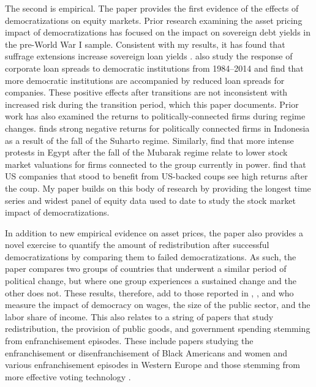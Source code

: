 \documentclass[12pt]{article}
\numberwithin{equation}{section}
\begin{document}
The second is empirical. The paper provides the first evidence of the effects of democratizations on equity markets. Prior research examining the asset pricing impact of democratizations has focused on the impact on sovereign debt yields in the pre-World War I sample. Consistent with my results, it has found that suffrage extensions increase sovereign loan yields \citep{Dasgupta2021,Tuncer2022}. \cite*{Delis2019} also study the response of corporate loan spreads to democratic institutions from 1984--2014 and find that more democratic institutions are accompanied by reduced loan spreads for companies. These positive effects after transitions are not inconsistent with increased risk during the transition period, which this paper documents. Prior work has also examined the returns to politically-connected firms during regime changes. \cite{Fisman2001} finds strong negative returns for politically connected firms in Indonesia as a result of the fall of the Suharto regime. Similarly, \cite*{Acemoglu2018} find that more intense protests in Egypt after the fall of the Mubarak regime relate to lower stock market valuations for firms connected to the group currently in power. \cite*{Dube2011} find that US companies that stood to benefit from US-backed coups see high returns after the coup. My paper builds on this body of research by providing the longest time series and widest panel of equity data used to date to study the stock market impact of democratizations.

In addition to new empirical evidence on asset prices, the paper also provides a novel exercise to quantify the amount of redistribution after successful democratizations by comparing them to failed democratizations. As such, the paper compares two groups of countries that underwent a similar period of political change, but where one group experiences a sustained change and the other does not. These results, therefore, add to those reported in \cite*{Rodrik1999}, \cite*{Acemoglu2015}, and \cite*{Drautzburg2022} who measure the impact of democracy on wages, the size of the public sector, and the labor share of income. This also relates to a string of papers that study redistribution, the provision of public goods, and government spending stemming from enfranchisement episodes. These include papers studying the enfranchisement or disenfranchisement of Black Americans \citep{Husted1997,Naidu2012,Cascio2013} and women \citep{Miller2008} and various enfranchisement episodes in Western Europe \citep{Aidt2009,Hinnerich2014} and those stemming from more effective voting technology \citep{Fujiwara2015}. 
\end{document}
